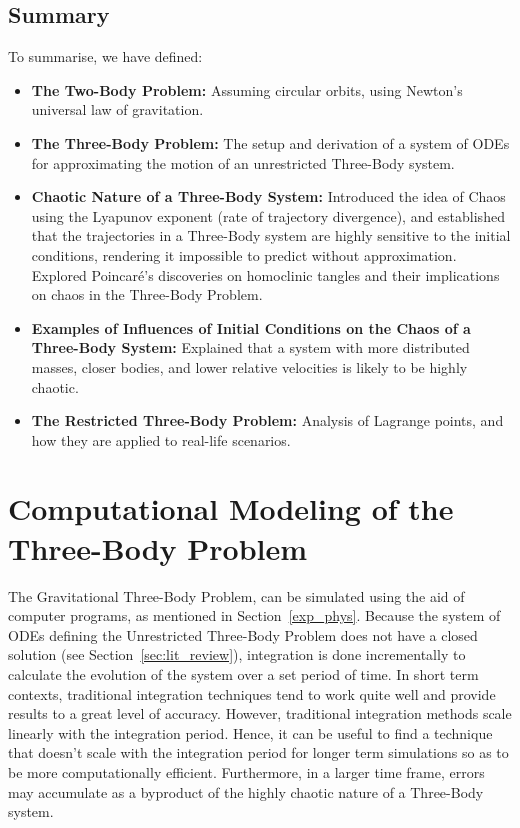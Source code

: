 \documentclass[12pt]{article}
\begin{document}
\subsection{Summary}

To summarise, we have defined:

\begin{itemize}
    \item \textbf{The Two-Body Problem:} Assuming circular orbits, using Newton's universal law of gravitation.
    \item \textbf{The Three-Body Problem:} The setup and derivation of a system of ODEs for approximating the motion of an unrestricted Three-Body system.
    \item \textbf{Chaotic Nature of a Three-Body System:} Introduced the idea of Chaos using the Lyapunov exponent (rate of trajectory divergence), and established that the trajectories in a Three-Body system are highly sensitive to the initial conditions, rendering it impossible to predict without approximation. Explored Poincar\'{e}'s discoveries on homoclinic tangles and their implications on chaos in the Three-Body Problem.
    \item \textbf{Examples of Influences of Initial Conditions on the Chaos of a Three-Body System:} Explained that a system with more distributed masses, closer bodies, and lower relative velocities is likely to be highly chaotic.
    \item \textbf{The Restricted Three-Body Problem:} Analysis of Lagrange points, and how they are applied to real-life scenarios.
\end{itemize}

\section{Computational Modeling of the Three-Body Problem}
\label{sec:comp_modeling}
The Gravitational Three-Body Problem, can be simulated using the aid of computer programs, as mentioned in Section~\ref{exp_phys}. Because the system of ODEs defining the Unrestricted Three-Body Problem does not have a closed solution (see Section~\ref{sec:lit_review}), integration is done incrementally to calculate the evolution of the system over a set period of time. In short term contexts, traditional integration techniques tend to work quite well and provide results to a great level of accuracy. However, traditional integration methods scale linearly with the integration period. Hence, it can be useful to find a technique that doesn't scale with the integration period for longer term simulations so as to be more computationally efficient. Furthermore, in a larger time frame, errors may accumulate as a byproduct of the highly chaotic nature of a Three-Body system.
\end{document}
